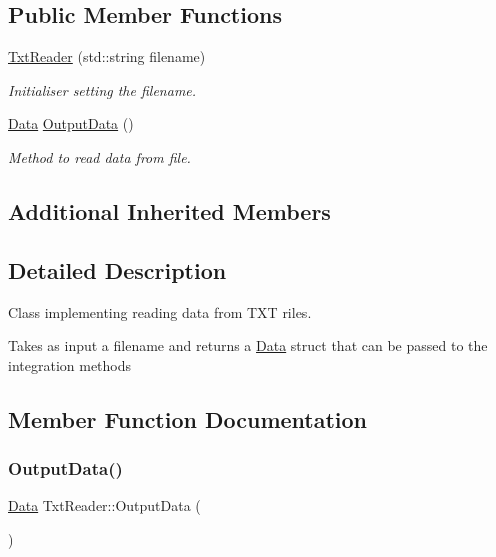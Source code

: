 \subsection*{Public Member Functions}
\begin{DoxyCompactItemize}
\item 
\mbox{\label{class_txt_reader_acbef0ef9c6034581d76a3b9e305f1508}} 
\hyperlink{class_txt_reader_acbef0ef9c6034581d76a3b9e305f1508}{Txt\+Reader} (std\+::string filename)
\begin{DoxyCompactList}\small\item\em Initialiser setting the filename. \end{DoxyCompactList}\item 
\hyperlink{struct_data}{Data} \hyperlink{class_txt_reader_a30786dcd83c2f24dd26e83cb5fd934ab}{Output\+Data} ()
\begin{DoxyCompactList}\small\item\em Method to read data from file. \end{DoxyCompactList}\end{DoxyCompactItemize}
\subsection*{Additional Inherited Members}


\subsection{Detailed Description}
Class implementing reading data from T\+XT riles. 

Takes as input a filename and returns a \hyperlink{struct_data}{Data} struct that can be passed to the integration methods 

\subsection{Member Function Documentation}
\mbox{\label{class_txt_reader_a30786dcd83c2f24dd26e83cb5fd934ab}} 
\subsubsection{\texorpdfstring{Output\+Data()}{OutputData()}}
{\footnotesize\ttfamily \hyperlink{struct_data}{Data} Txt\+Reader\+::\+Output\+Data (\begin{DoxyParamCaption}{ }\end{DoxyParamCaption})\hspace{0.3cm}{\ttfamily [virtual]}}



